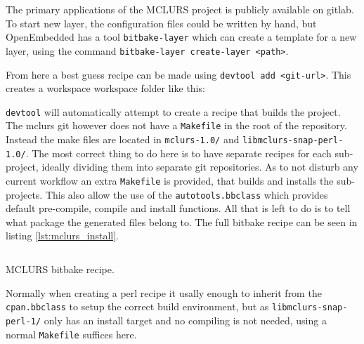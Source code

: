\documentclass[../../main.tex]{subfiles}
\begin{document}
The primary applications of the MCLURS project is publicly available on gitlab\cite{mclurs-git}.
To start new layer, the configuration files could be written by hand, but
OpenEmbedded has a tool \texttt{bitbake-layer} which can create
a template for a new layer, using the command \texttt{bitbake-layer create-layer <path>}. 

From here a best guess recipe can be made using \texttt{devtool add <git-url>}.
This creates a workspace workspace folder like this:

\texttt{devtool} will automatically attempt to create a recipe that builds the project.
The mclurs git however does not have a \texttt{Makefile} in the root of the repository.
Instead the make files are located in \texttt{mclurs-1.0/} and
\texttt{libmclurs-snap-perl-1.0/}.
The most correct thing to do here is to have separate recipes for each sub-project, ideally
dividing them into separate git repositories.
As to not disturb any current workflow an extra \texttt{Makefile} is provided, that
builds and installs the sub-projects. This also allow the use of the
\texttt{autotools.bbclass} which provides default pre-compile, compile and install
functions. All that is left to do is to tell what package the generated files belong to.
The full bitbake recipe can be seen in listing \ref{lst:mclurs_install}.

\begin{listing}
	\inputminted[firstline=13]{bitbake}{/home/aske/Bachelor/mender-raspberrypi/meta-mclurs/recipes-mclurs/mclurs/mclurs_git.bb}
\caption{MCLURS bitbake recipe.}
\label{lst:mclurs_install}
\end{listing}

Normally when creating a perl recipe it usally enough to inherit from the
\texttt{cpan.bbclass} to setup the correct build environment, but as
\texttt{libmclurs-snap-perl-1/} only has an install target and no compiling
is not needed, using a normal \texttt{Makefile} suffices here.\\
\end{document}
